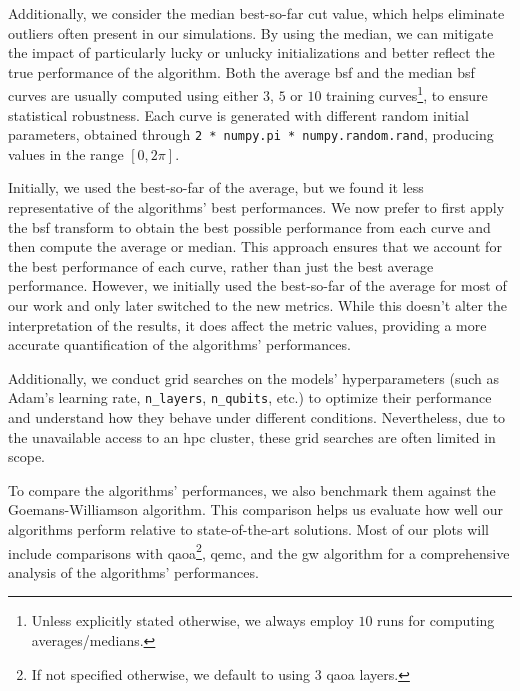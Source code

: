 Additionally, we consider the median best-so-far cut value, which helps eliminate outliers often present in our simulations. By using the median, we can mitigate the impact of particularly lucky or unlucky initializations and better reflect the true performance of the algorithm. Both the average \acrshort{bsf} and the median \acrshort{bsf} curves are usually computed using either $3$, $5$ or $10$ training curves\footnote{Unless explicitly stated otherwise, we always employ $10$ runs for computing averages/medians.}, to ensure statistical robustness. Each curve is generated with different random initial parameters, obtained through \texttt{2 * numpy.pi * numpy.random.rand}, producing values in the range $[0,2\pi]$.

Initially, we used the best-so-far of the average, but we found it less representative of the algorithms' best performances. We now prefer to first apply the \acrshort{bsf} transform to obtain the best possible performance from each curve and then compute the average or median. This approach ensures that we account for the best performance of each curve, rather than just the best average performance. However, we initially used the best-so-far of the average for most of our work and only later switched to the new metrics. While this doesn't alter the interpretation of the results, it does affect the metric values, providing a more accurate quantification of the algorithms' performances.

Additionally, we conduct grid searches on the models' hyperparameters (such as Adam's learning rate, \texttt{n\_layers}, \texttt{n\_qubits}, etc.) to optimize their performance and understand how they behave under different conditions. Nevertheless, due to the unavailable access to an \acrshort{hpc} cluster, these grid searches are often limited in scope.

To compare the algorithms' performances, we also benchmark them against the Goemans-Williamson algorithm. This comparison helps us evaluate how well our algorithms perform relative to state-of-the-art solutions. Most of our plots will include comparisons with \acrshort{qaoa}\footnote{If not specified otherwise, we default to using $3$ \acrshort{qaoa} layers.}, \acrshort{qemc}, and the \acrshort{gw} algorithm for a comprehensive analysis of the algorithms' performances.
